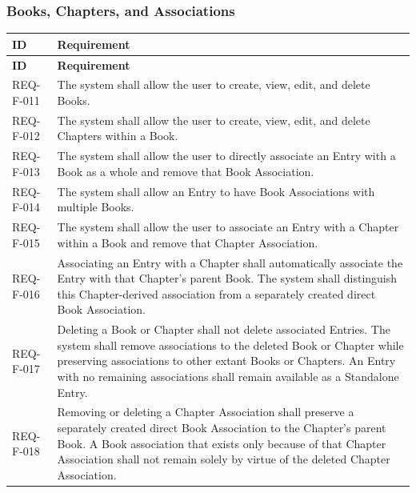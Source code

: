\documentclass[11pt,a4paper]{article}
\begin{document}
\subsubsection{Books, Chapters, and Associations}
\begin{longtable}{|L{2.2cm}|L{13.6cm}|}
\hline \textbf{ID} & \textbf{Requirement} \\
\hline
\endfirsthead
\hline \textbf{ID} & \textbf{Requirement} \\
\hline
\endhead
REQ-F-011 & The system shall allow the user to create, view, edit, and delete Books. \\ \hline
REQ-F-012 & The system shall allow the user to create, view, edit, and delete Chapters within a Book. \\ \hline
REQ-F-013 & The system shall allow the user to directly associate an Entry with a Book as a whole and remove that Book Association. \\ \hline
REQ-F-014 & The system shall allow an Entry to have Book Associations with multiple Books. \\ \hline
REQ-F-015 & The system shall allow the user to associate an Entry with a Chapter within a Book and remove that Chapter Association. \\ \hline
REQ-F-016 & Associating an Entry with a Chapter shall automatically associate the Entry with that Chapter's parent Book. The system shall distinguish this Chapter-derived association from a separately created direct Book Association. \\ \hline
REQ-F-017 & Deleting a Book or Chapter shall not delete associated Entries. The system shall remove associations to the deleted Book or Chapter while preserving associations to other extant Books or Chapters. An Entry with no remaining associations shall remain available as a Standalone Entry. \\ \hline
REQ-F-018 & Removing or deleting a Chapter Association shall preserve a separately created direct Book Association to the Chapter's parent Book. A Book association that exists only because of that Chapter Association shall not remain solely by virtue of the deleted Chapter Association. \\ \hline
\end{longtable}
\end{document}
